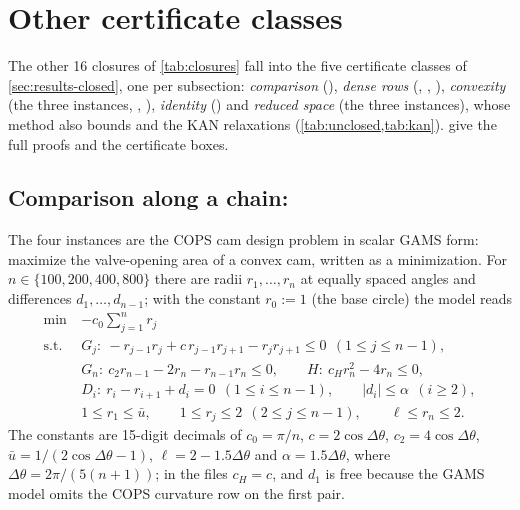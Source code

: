 \section{Other certificate classes}\label{sec:other}

The other 16 closures of \cref{tab:closures} fall into the five certificate classes of \cref{sec:results-closed}, one per subsection: \emph{comparison} (), \emph{dense rows} (, , ), \emph{convexity} (the three  instances, , ), \emph{identity} () and \emph{reduced space} (the three  instances), whose method also bounds  and the KAN relaxations (\cref{tab:unclosed,tab:kan}).
 give the full proofs and the certificate boxes.

\subsection{Comparison along a chain: }\label{sec:other-camshape}

The four  instances are the COPS cam design problem \citep{dolan2001-benchmarking-optimization-software-with-cops} in scalar GAMS form: maximize the valve-opening area of a convex cam, written as a minimization.
For $n\in\{100,200,400,800\}$ there are radii $r_1,\dots,r_n$ at equally spaced angles and differences $d_1,\dots,d_{n-1}$; with the constant $r_0:=1$ (the base circle) the model reads
\begin{equation}\label{eq:camshape-problem}
\begin{aligned}
\min\ & -c_0\textstyle\sum_{j=1}^{n} r_j\\
\text{s.t.}\ & G_j:\ -r_{j-1}r_j+c\,r_{j-1}r_{j+1}-r_jr_{j+1}\le 0\ \ (1\le j\le n-1),\\
& G_n:\ c_2r_{n-1}-2r_n-r_{n-1}r_n\le 0,\qquad H:\ c_Hr_n^2-4r_n\le 0,\\
& D_i:\ r_i-r_{i+1}+d_i=0\ \ (1\le i\le n-1),\qquad |d_i|\le\alpha\ \ (i\ge2),\\
& 1\le r_1\le\bar u,\qquad 1\le r_j\le 2\ \ (2\le j\le n-1),\qquad \ell\le r_n\le 2 .
\end{aligned}
\end{equation}
The constants are 15-digit decimals of $c_0=\pi/n$, $c=2\cos\Delta\theta$, $c_2=4\cos\Delta\theta$, $\bar u=1/(2\cos\Delta\theta-1)$, $\ell=2-1.5\Delta\theta$ and $\alpha=1.5\Delta\theta$, where $\Delta\theta=2\pi/(5(n+1))$; in the files $c_H=c$, and $d_1$ is free because the GAMS model omits the COPS curvature row on the first pair.

